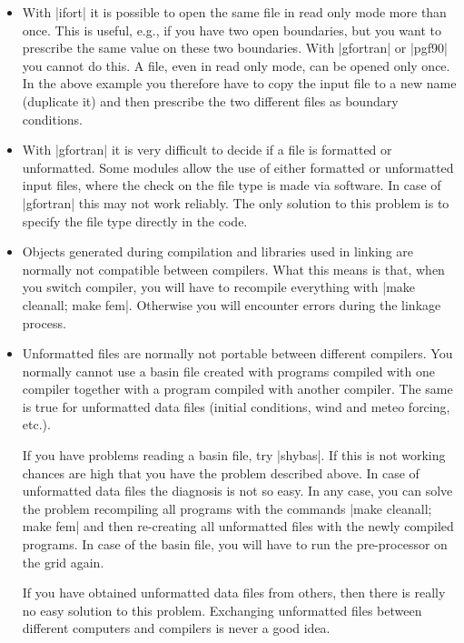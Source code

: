 \begin{itemize}

\item With |ifort| it is possible to open the same file in
read only mode more than once. This is useful, e.g., if you have two
open boundaries, but you want to prescribe the same value on these
two boundaries. With |gfortran| or |pgf90| you cannot do this. A file,
even in read only mode, can be opened only once. In the above example
you therefore have to copy the input file to a new name (duplicate it)
and then prescribe the two different files as boundary conditions.

\item With |gfortran| it is very difficult to decide if a file is
formatted or unformatted. Some modules allow the use of either formatted
or unformatted input files, where the check on the file type is made
via software. In case of |gfortran| this may not work reliably. The only
solution to this problem is to specify the file type directly in the code.

\item Objects generated during compilation and libraries used in linking
are normally not compatible between compilers. What this means is that,
when you switch compiler, you will have to recompile everything with
|make cleanall; make fem|. Otherwise you will encounter errors during
the linkage process.

\item Unformatted files are normally not portable between different
compilers. You normally cannot use a basin file created with programs
compiled with one compiler together with a program compiled with another
compiler. The same is true for unformatted data files (initial conditions,
wind and meteo forcing, etc.).

If you have problems reading a basin file, try |shybas|. If this is
not working chances are high that you have the problem described above.
In case of unformatted data files the diagnosis is not so easy. In any
case, you can solve the problem recompiling all programs with the commands
|make cleanall; make fem| and then re-creating all unformatted files
with the newly compiled programs. In case of the basin file, you will
have to run the pre-processor on the grid again.

If you have obtained unformatted data files from others, then there is
really no easy solution to this problem. Exchanging unformatted files
between different computers and compilers is never a good idea.


\end{itemize}
